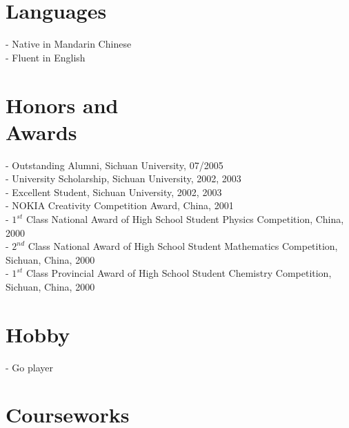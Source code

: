 \documentclass[margin,line]{resume}
\begin{document}
\begin{resume}
    \section{\mysidestyle Languages}
      
      - Native in Mandarin Chinese \\
      - Fluent in English 
      

      
    \section{\mysidestyle Honors and \\ Awards} 
      
      - Outstanding Alumni, Sichuan University, 07/2005 \\
      - University Scholarship, Sichuan University, 2002, 2003 \\
      - Excellent Student, Sichuan University, 2002, 2003 \\
      - NOKIA Creativity Competition Award, China, 2001 \\
      - $1^{st}$ Class National Award of High School Student Physics Competition, China, 2000 \\
      - $2^{nd}$ Class National Award of High School Student Mathematics Competition, Sichuan, China, 2000 \\
      - $1^{st}$ Class Provincial Award of High School Student Chemistry Competition, Sichuan, China, 2000       
      

    \section{\mysidestyle Hobby} 
      
	- Go player
      
    \section{\mysidestyle Courseworks}


\end{resume}
\end{document}
